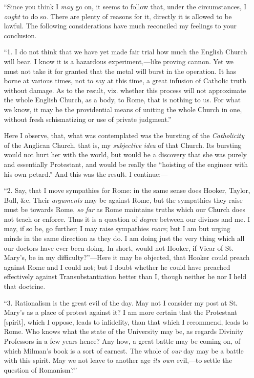 ``Since you think I \emph{may} go on, it seems to follow that,
under the circumstances, I \emph{ought} to do so. There are plenty of
reasons for it, directly it is allowed to be lawful. The following
considerations have much reconciled my feelings to your conclusion.

``1. I do not think that we have yet made fair trial how much the
English Church will bear. I know it is a hazardous experiment,—like
proving cannon. Yet we must not take it for granted that the metal will
burst in the operation. It has borne at various times, not to say at
this time, a great infusion of Catholic truth without damage. As to the
result, viz. whether this process will not approximate the whole English
Church, as a body, to Rome, that is nothing to us. For what we
know, it may be the providential means of uniting the whole Church in
one, without fresh schismatizing or use of private judgment.''

Here I observe, that, what was contemplated was the bursting of the \emph{Catholicity}
of the Anglican Church, that is, my \emph{subjective idea} of that
Church. Its bursting would not hurt her with the world, but would be a
discovery that she was purely and essentially Protestant, and would be
really the ``hoisting of the engineer with his own petard.'' And
this was the result. I continue:—

``2. Say, that I move sympathies for Rome: in the same sense does
Hooker, Taylor, Bull, \&c. Their \emph{arguments} may be
against Rome, but the sympathies they raise must be towards Rome, \emph{so
far} as Rome maintains truths which our Church does not teach or
enforce. Thus it is a question of \emph{degree} between our divines and
me. I may, if so be, go further; I may raise sympathies \emph{more}; but
I am but urging minds in the same direction as they do. I am doing just
the very thing which all our doctors have ever been doing. In short,
would not Hooker, if Vicar of St. Mary's, be in my
difficulty?''—Here it may be objected, that Hooker could
preach against Rome and I could not; but I doubt whether he could have
preached effectively against Transubstantiation better than I, though
neither he nor I held that doctrine.

``3. Rationalism is the great evil of the day. May not I consider
my post at St. Mary's as a place of protest against it? I am more
certain that the Protestant [spirit], which I oppose, leads to
infidelity, than that which I recommend, leads to Rome. Who knows what
the state of the University may be, as regards Divinity Professors in a
few years hence? Any how, a great battle may be coming on, of which
Milman's book is a sort of earnest. The whole of \emph{our} day
may be a battle with this spirit. May we not leave to another age \emph{its
own} evil,—to settle the question of Romanism?''

